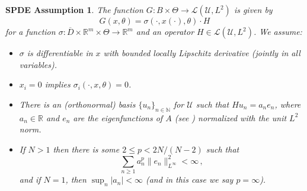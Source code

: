 \documentclass[final]{amsart}
\newtheorem{sass}{SPDE Assumption}[]
\numberwithin{thm}{section}
\numberwithin{equation}{section}
\newcommand{\U}{\mathcal{U}}
\newcommand{\N}{\mathbb{N}}
\newcommand{\R}{\mathbb{R}}
\newcommand{\Ll}{\mathcal{L}}
\begin{document}
\begin{sass}\label{SPDE-G-sass}
    The function $G: B \times \Theta \to \Ll(\U,L^2)$ is given by
    $$G(x,\theta) = \sigma(\cdot,x(\cdot),\theta) \cdot H$$
    for a function $\sigma: \overline D \times \R^m \times \Theta \to \R^m$ and an operator $H \in \Ll(\U,L^2)$. We assume:
    \begin{itemize}
        \item $\sigma$ is differentiable in $x$ with bounded locally Lipschitz derivative (jointly in all variables).
        
        \item $x_i = 0$ implies $\sigma_i(\cdot,x,\theta) = 0$.
        \item There is an (orthonormal) basis $\{u_n\}_{n \in \N}$ for $\U$ such that $Hu_n = a_ne_n$, where $a_n \in \R$ and $e_n$ are the eigenfunctions of $A$ (see ) normalized with the unit $L^2$ norm.
        \item If $N > 1$ then there is some $2 \leq p < 2N/(N-2)$ such that
        \begin{equation}\label{eq:an-en-assumption}
            \sum_{n \geq 1} a_n^p\|e_n\|_{L^\infty}^2 < \infty \,,
        \end{equation}
        and if $N = 1$, then $\sup_n |a_n| < \infty$ (and in this case we say $p = \infty$).
    \end{itemize}
\end{sass}
\end{document}
